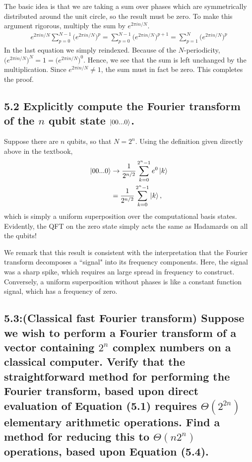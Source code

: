 \documentclass{article}
\begin{document}
The basic idea is that we are taking a sum over phases which are symmetrically distributed around the unit circle, so the result must be zero. To make this argument rigorous, multiply the sum by $e^{2\pi i n/N}$.
\begin{align}
    e^{2\pi i n/N}\sum_{p=0}^{N-1}\big(e^{2\pi i n/N}\big)^p = \sum_{p=0}^{N-1}\big(e^{2\pi i n/N}\big)^{p+1} = \sum_{p=1}^{N}\big(e^{2\pi i n/N}\big)^{p}
\end{align}
In the last equation we simply reindexed. Because of the $N$-periodicity, $\big(e^{2\pi i n/N}\big)^N = 1 = \big(e^{2\pi i n/N}\big)^0$. Hence, we see that the sum is left unchanged by the multiplication. Since $e^{2\pi i n/N} \neq 1$, the sum must in fact be zero. This completes the proof.

\subsection*{5.2 Explicitly compute the Fourier transform of the $n$ qubit state $\ket{00...0}$.}
Suppose there are $n$ qubits, so that $N=2^n$. Using the definition given directly above in the textbook,
\begin{align}
    \ket{00...0} &\rightarrow \frac{1}{2^{n/2}} \sum_{k=0}^{2^n-1}e^0 \ket{k} \\
    &= \frac{1}{2^{n/2}}\sum_{k=0}^{2^n-1}\ket{k},
\end{align}
which is simply a uniform superposition over the computational basis states. Evidently, the QFT on the zero state simply acts the same as Hadamards on all the qubits!

We remark that this result is consistent with the interpretation that the Fourier transform decomposes a ``signal" into its frequency components. Here, the signal was a sharp spike, which requires an large spread in frequency to construct. Conversely, a uniform superposition without phases is like a constant function signal, which has a frequency of zero. 

\subsection*{5.3:(Classical fast Fourier transform) Suppose we wish to perform a Fourier transform of a vector containing $2^n$ complex numbers on a classical computer. Verify that the straightforward method for performing the Fourier transform, based upon direct evaluation of Equation (5.1) requires $\Theta(2^{2n})$ elementary arithmetic operations. Find a method for reducing this to $\Theta(n2^n)$ operations, based upon Equation (5.4).}
\end{document}
